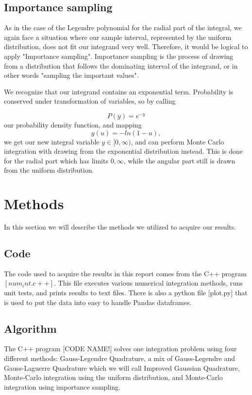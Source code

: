 \documentclass{emulateapj}
\begin{document}
\subsection{Importance sampling}
As in the case of the Legendre polynomial for the radial part of the integral, we again face a situation where our sample interval, represented by the uniform distribution, does not fit our integrand very well. Therefore, it would be logical to apply "Importance sampling". Importance sampling is the process of drawing from a distribution that follows the dominating interval of the integrand, or in other words "sampling the important values".

We recognize that our integrand contains an exponential term. Probability is conserved under transformation of variables, so by calling

\begin{equation}
    P(y) = e^{-y}
\end{equation}
our probability density function, and mapping
\begin{equation}
    y(u) = -ln\left(1-u\right),
\end{equation}
we get our new integral variable $y\in [0,\infty)$, and can perform Monte Carlo integration with drawing from the exponential distribution instead. This is done for the radial part which has limits $0,\infty$, while the angular part still is drawn from the uniform distribution.

\section{Methods}
\label{sec:methods}
In this section we will describe the methods we utilized to acquire our results.
\subsection{Code}
The code used to acquire the results in this report comes from the C++ program $[num_int.c++]$. This file executes various numerical integration methods, runs unit tests, and prints results to text files. There is also a python file [plot.py] that is used to put the data into easy to handle Pandas dataframes.

\subsection{Algorithm}
The C++ program [CODE NAME!] solves one integration problem using four different methods: Gauss-Legendre Quadrature, a mix of Gauss-Legendre and Gauss-Laguerre Quadrature which we will call Improved Gaussian Quadrature, Monte-Carlo integration using the uniform distribution, and Monte-Carlo integration using importance sampling.
\end{document}
